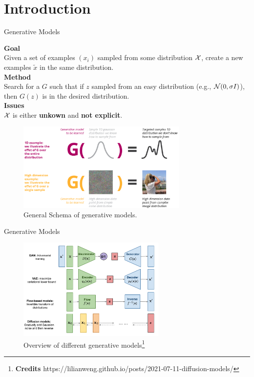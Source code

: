 \documentclass[aspectratio=169, 9pt]{beamer}
\theoremstyle{definition}
\begin{document}
\section{Introduction}
\begin{frame}{Generative Models}
  \begin{minipage}{0.4\textwidth}
    \textbf{Goal}\\
    Given a set of examples  $(x_i)$ sampled from
    some distribution $\mathcal{X}$, create a new examples $\tilde x$ in the same
    distribution.\\

    \textbf{Method}\\
    Search for a $G$ such that if $z$ sampled from an easy distribution
    (e.g., $\mathcal{N}(0,\sigma I)$), then $G(z)$ is in the desired distribution.\\

    \textbf{Issues}\\
    $\mathcal{X}$ is either \textbf{unkown} and \textbf{not explicit}.\\

  \end{minipage}\hfill
  \begin{minipage}{0.6\textwidth}
  \begin{figure}[h!]
    \centering
    \includegraphics[clip,  width=0.75\textwidth, trim=10cm 0 0 0]{./pic/generative-models-introa.png}
    \caption{General Schema of generative models.}
  \end{figure}
\end{minipage}
\end{frame}
\begin{frame}{Generative Models}
  \begin{figure}[h]
    \centering
    \includegraphics[width=0.65\textwidth]{./pic/generative-overview.png}
    \caption{Overview of different generative
    models\footnote{\textbf{Credits}
  https://lilianweng.github.io/posts/2021-07-11-diffusion-models/}}
  \end{figure}
\end{frame}
\end{document}
